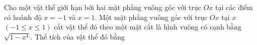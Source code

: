 \begin{ex}
Cho một vật thể giới hạn bởi hai mặt phẳng vuông góc với trục $Ox$ tại các điểm có hoành độ $x=-1$ và $x=1$. Một mặt phẳng vuông góc với trục $Ox$ tại $x$ $(-1\le x\le1)$ cắt vật thể đó theo một mặt cắt là hình vuông có cạnh bằng $\sqrt{1-x^4}$. Thể tích của vật thể đó bằng
\end{ex}
